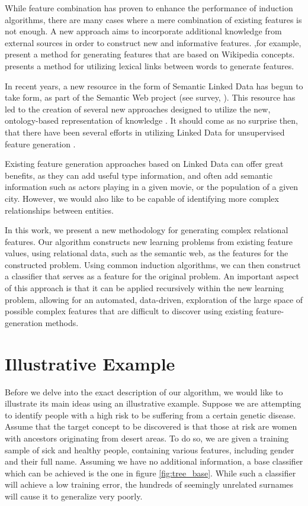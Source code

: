 \documentclass[twoside,11pt]{article}
\theoremstyle{definition}
\begin{document}
While feature combination has proven to enhance the performance of induction algorithms, there are many cases where a mere combination of existing features is not enough. A new approach aims to incorporate additional knowledge from external sources in order to construct new and informative features.
\citet{gabrilovich2009wikipedia} ,for example, present a method for generating features that are based on Wikipedia concepts. \citet{jarmasz2012roget} presents a method for utilizing lexical links between words to generate features.

In recent years, a new resource in the form of Semantic Linked Data has begun to take form, as part of the Semantic Web project (see survey, \citet{bizer2009linked}). This resource has led to the creation of several new approaches designed to utilize the new, ontology-based representation of knowledge \citep{losch2012graph,rios2014statistical}.
It should come as no surprise then, that there have been several efforts in utilizing Linked Data for unsupervised feature generation \citep{cheng2011automated, paulheim2012unsupervised}.

Existing feature generation approaches based on Linked Data can offer great benefits, as they can add useful type information, and often add semantic information such as actors playing in a given movie, or the population of a given city.
However, we would also like to be capable of identifying more complex relationships between entities.

In this work, we present a new methodology for generating complex relational features.  Our algorithm constructs new learning problems from existing feature values, using relational data, such as the semantic web, as the features for the constructed problem.
Using common induction algorithms, we can then construct a classifier that serves as a feature for the original problem. An important aspect of this approach is that it can be applied recursively within the new learning problem, allowing for an automated, data-driven, exploration of the large space of possible  complex features that are difficult to discover using existing feature-generation methods.

\section{Illustrative Example}

Before we delve into the exact description of our algorithm, we would like to illustrate its main ideas using an illustrative example.
Suppose we are attempting to identify people with a high risk to be suffering from a certain genetic disease. Assume that the target concept to be discovered is that those at risk are women with ancestors originating from desert areas. To do so, we are given a training sample of sick and healthy people, containing various features, including gender and their full name.
Assuming we have no additional information, a base classifier which can be achieved is the one in figure \ref{fig:tree_base}. While such a classifier will achieve a low training error, the hundreds of seemingly unrelated surnames will cause it to generalize very poorly.
\end{document}
